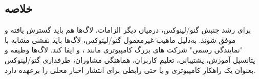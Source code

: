 \subsection{خلاصه}

برای رشد جنبش گنو/لینوکس، درمیان دیگر الزامات، لاگ‌ها هم باید گسترش یافته و موفق شوند.
به‌دلیل ماهیت غیرمعمول گنو/لینوکس، لاگ‌ها باید نقشی مشابه با "نمایندگی رسمی"
شرکت های بزرگ کامپیوتری مانند ،  و 
ایفا کند. لاگ‌ها وظیفه و پتانسیل آموزش، پشتیبانی، تعلیم کاربران، هماهنگی مشاوران،
طرفداری گنو/لینوکس بعنوان یک راهکار کامپیوتری و یا حتی رابطی برای انتشار اخبار محلی را برعهده دارد.

